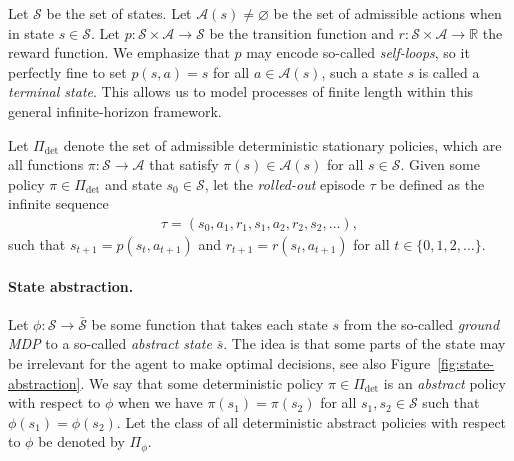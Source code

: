 \documentclass[a4paper]{report}
\theoremstyle{definition}
\theoremstyle{plain}
\begin{document}
Let $\mathcal{S}$ be the set of states. Let $\mathcal{A}(s) \neq \varnothing$ be
the set of admissible actions when in state $s \in \mathcal{S}$. Let
$p : \mathcal{S} \times \mathcal{A} \rightarrow \mathcal{S}$ be the transition
function and $r : \mathcal{S} \times \mathcal{A} \rightarrow \mathbb{R}$ the
reward function.
We emphasize that $p$ may encode so-called \emph{self-loops}, so it perfectly
fine to set $p(s, a) = s$ for all $a \in \mathcal{A}(s)$, such a state $s$ is
called a \emph{terminal state}. This allows us to model processes of finite
length within this general infinite-horizon framework.

Let $\Pi_\text{det}$ denote the set of admissible deterministic stationary
policies, which are all functions $\pi: \mathcal{S} \rightarrow \mathcal{A}$
that satisfy $\pi(s) \in \mathcal{A}(s)$ for all $s \in \mathcal{S}$.
%
Given some policy $\pi \in \Pi_\text{det}$ and state $s_0 \in \mathcal{S}$, let
the \emph{rolled-out} episode $\tau$ be defined as the infinite sequence
\begin{align}
  \tau = (s_0, a_1, r_1, s_1, a_2, r_2, s_2, \dots) ,
\end{align}
such that $s_{t+1} = p(s_t, a_{t+1})$ and $r_{t+1} = r(s_t, a_{t+1})$ for all
$t \in \{ 0, 1, 2, \dots \}$.

\paragraph{State abstraction.}

Let $\phi : \mathcal{S} \rightarrow \bar{\mathcal{S}}$ be some function that
takes each state $s$ from the so-called \emph{ground MDP} to a so-called
\emph{abstract state} $\bar{s}$.
%
The idea is that some parts of the state may be irrelevant for the agent to make
optimal decisions, see also Figure~\ref{fig:state-abstraction}.
%
%
We say that some deterministic policy $\pi \in \Pi_\text{det}$ is an
\emph{abstract} policy with respect to $\phi$ when we have $\pi(s_1) = \pi(s_2)$
for all $s_1, s_2 \in \mathcal{S}$ such that $\phi(s_1) = \phi(s_2)$.
%
Let the class of all deterministic abstract policies with respect to $\phi$ be
denoted by $\Pi_\phi$.
\end{document}
